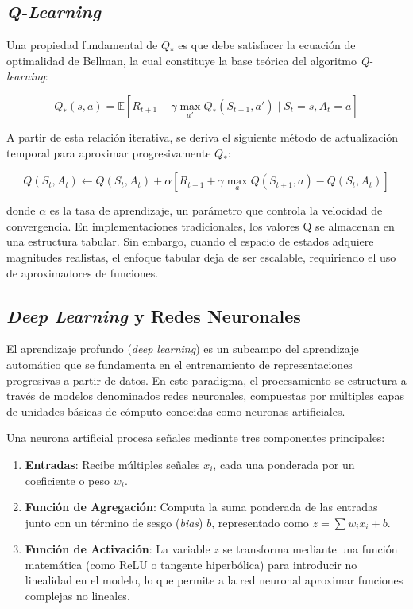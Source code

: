 \subsection{\textit{Q-Learning}}

Una propiedad fundamental de $Q_*$ es que debe satisfacer la ecuación de optimalidad de Bellman, la cual constituye la base teórica del algoritmo \textit{Q-learning}:

\begin{equation}
Q_* (s,a) = \mathbb{E} \left[ R_{t+1} + \gamma \max_{a'} Q_*(S_{t+1},a') \mid S_t = s, A_t = a \right]
\end{equation}

A partir de esta relación iterativa, se deriva el siguiente método de actualización temporal para aproximar progresivamente $Q_*$:

\begin{equation}
Q(S_t, A_t) \leftarrow Q(S_t, A_t) + \alpha \left[ R_{t+1} + \gamma \max_{a} Q(S_{t+1},a) - Q(S_t, A_t) \right]
\end{equation}

donde \(\alpha\) es la tasa de aprendizaje, un parámetro que controla la velocidad de convergencia. En implementaciones tradicionales, los valores Q se almacenan en una estructura tabular. Sin embargo, cuando el espacio de estados adquiere magnitudes realistas, el enfoque tabular deja de ser escalable, requiriendo el uso de aproximadores de funciones.

\subsection{\textit{Deep Learning} y Redes Neuronales}

El aprendizaje profundo (\textit{deep learning}) es un subcampo del aprendizaje automático que se fundamenta en el entrenamiento de representaciones progresivas a partir de datos. En este paradigma, el procesamiento se estructura a través de modelos denominados redes neuronales, compuestas por múltiples capas de unidades básicas de cómputo conocidas como neuronas artificiales.

Una neurona artificial procesa señales mediante tres componentes principales:
\begin{enumerate}
    \item \textbf{Entradas}: Recibe múltiples señales \(x_i\), cada una ponderada por un coeficiente o peso \(w_i\).
    \item \textbf{Función de Agregación}: Computa la suma ponderada de las entradas junto con un término de sesgo (\textit{bias}) \(b\), representado como \(z = \sum w_i x_i + b\).
    \item \textbf{Función de Activación}: La variable \(z\) se transforma mediante una función matemática (como ReLU o tangente hiperbólica) para introducir no linealidad en el modelo, lo que permite a la red neuronal aproximar funciones complejas no lineales.
\end{enumerate}

